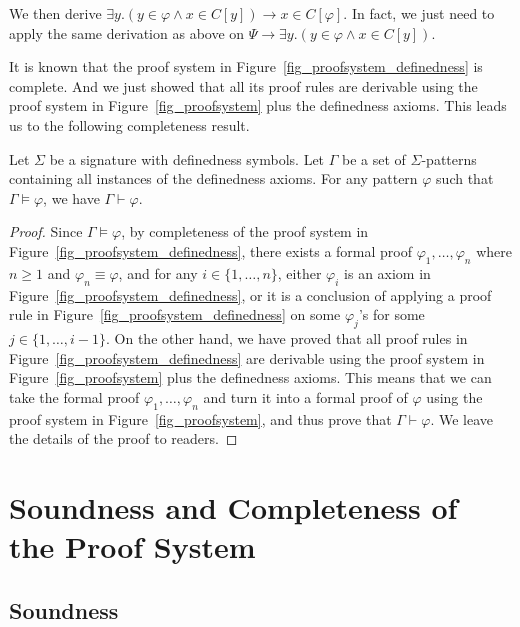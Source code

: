 \documentclass[acmsmall]{acmart}
\theoremstyle{acmdefinition}
\newcommand{\imp}{\to}
\newcommand{\ddd}{,\dots,}
\newcommand{\Figure}[1]{Figure~\ref{#1}}
\begin{document}
We then derive
$ \exists y . ( y \in \varphi \wedge x \in C[y] )
\imp x \in C[\varphi]$.
In fact, we just need to apply the same derivation as above on
$\Psi \imp \exists y . ( y \in \varphi \wedge x \in C[y] )$.







It is known that the proof system in \Figure{fig_proofsystem_definedness} is 
complete.
And we just showed that all its proof rules are derivable using the proof 
system in \Figure{fig_proofsystem} plus the definedness axioms.
This leads us to the following completeness result.

\begin{proposition}
Let $\Sigma$ be a signature with definedness symbols. Let $\Gamma$ be a set of 
$\Sigma$-patterns containing all instances of the definedness axioms.
For any pattern $\varphi$ such that $\Gamma \vDash \varphi$, 
we have $\Gamma \vdash \varphi$.
\end{proposition}
\begin{proof}
Since $\Gamma \vDash \varphi$, by completeness of the proof system in 
\Figure{fig_proofsystem_definedness}, there exists a formal proof
$\varphi_1, \dots, \varphi_n$
where $n \ge 1$ and $\varphi_n \equiv \varphi$, and 
for any $i \in \{1 \ddd n\}$, either $\varphi_i$ is an axiom in 
\Figure{fig_proofsystem_definedness}, or it is a conclusion of applying a 
proof rule in 
\Figure{fig_proofsystem_definedness} on some $\varphi_j$'s for some 
$j \in \{1 \ddd i-1\}$.
On the other hand, we have proved that all proof rules in 
\Figure{fig_proofsystem_definedness} are derivable using the proof system in
\Figure{fig_proofsystem} plus the definedness axioms.
This means that we can take the formal proof $\varphi_1 \ddd \varphi_n$ and 
turn it into a formal proof of $\varphi$ using the proof system in
\Figure{fig_proofsystem}, and thus prove that $\Gamma \vdash \varphi$.
We leave the details of the proof to readers.
\end{proof}


\section{Soundness and Completeness of the Proof System}
\label{sec_soundness_and_completeness}

\subsection{Soundness}
\label{sec_soundness}
\end{document}
